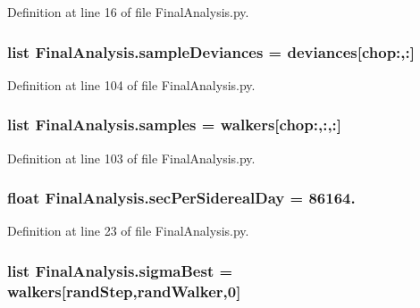 Definition at line 16 of file Final\-Analysis.\-py.

\hypertarget{namespace_final_analysis_a0a76ade78d1bb36b45ca6950b6a340a9}{
\subsubsection[{sample\-Deviances}]{\setlength{\rightskip}{0pt plus 5cm}list Final\-Analysis.\-sample\-Deviances = {\bf deviances}\mbox{[}chop\-:,\-:\mbox{]}}}\label{namespace_final_analysis_a0a76ade78d1bb36b45ca6950b6a340a9}


Definition at line 104 of file Final\-Analysis.\-py.

\hypertarget{namespace_final_analysis_aa61b8c8a4b0a4c679d09737c3ae4c39c}{
\subsubsection[{samples}]{\setlength{\rightskip}{0pt plus 5cm}list Final\-Analysis.\-samples = {\bf walkers}\mbox{[}chop\-:,\-:,\-:\mbox{]}}}\label{namespace_final_analysis_aa61b8c8a4b0a4c679d09737c3ae4c39c}


Definition at line 103 of file Final\-Analysis.\-py.

\hypertarget{namespace_final_analysis_aad4e1075c61393b18c1fe9942acd8789}{
\subsubsection[{sec\-Per\-Sidereal\-Day}]{\setlength{\rightskip}{0pt plus 5cm}float Final\-Analysis.\-sec\-Per\-Sidereal\-Day = 86164.}}\label{namespace_final_analysis_aad4e1075c61393b18c1fe9942acd8789}


Definition at line 23 of file Final\-Analysis.\-py.

\hypertarget{namespace_final_analysis_ab9b839125655898989c2bba36c4b2d82}{
\subsubsection[{sigma\-Best}]{\setlength{\rightskip}{0pt plus 5cm}list Final\-Analysis.\-sigma\-Best = {\bf walkers}\mbox{[}{\bf rand\-Step},{\bf rand\-Walker},0\mbox{]}}}\label{namespace_final_analysis_ab9b839125655898989c2bba36c4b2d82}


